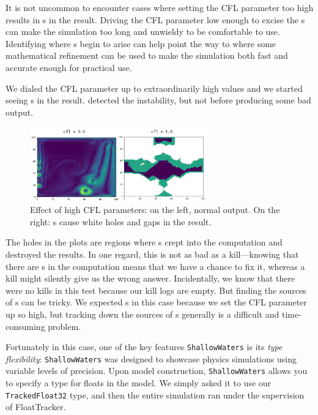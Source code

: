 \documentclass{juliacon}
\begin{document}
It is not uncommon to encounter cases where setting the CFL parameter too high results in \NaN{}s in the result.
Driving the CFL parameter low enough to excise the \NaN{}s can make the simulation too long and unwieldy to be comfortable to use.
Identifying where \NaN{}s begin to arise can help point the way to where some mathematical refinement can be used to make the simulation both fast and accurate enough for practical use.

We dialed the CFL parameter up to extraordinarily high values and we started seeing \NaN{}s in the result.
 detected the instability, but not before producing some bad output.

\begin{figure}
  \centering
  \includegraphics[width=3in]{./fig/shallow_waters_cfl_diff.png}
  \caption{Effect of high CFL parameters: on the left, normal output. On the right: \NaN{}s cause white holes and gaps in the result.}
  \label{fig:sw_nans}
\end{figure}

The holes in the plots are regions where \NaN{}s crept into the computation and destroyed the results.
In one regard, this is not as bad as a \NaN{} kill---knowing that there are \NaN{}s in the computation means that we have a chance to fix it, whereas a \NaN{} kill might silently give us the wrong answer.
Incidentally, we know that there were no \NaN{} kills in this test because our kill logs are empty.
But finding the sources of \NaN{}s can be tricky.
We expected \NaN{}s in this case because we set the CFL parameter up so high, but tracking down the sources of \NaN{}s generally is a difficult and time-consuming problem.

Fortunately in this case, one of the key features \texttt{ShallowWaters} is its \emph{type flexibility}:
\texttt{ShallowWaters} was designed to showcase physics simulations using variable levels of \fp{} precision.
Upon model construction, \texttt{ShallowWaters} allows you to specify a type for floats in the model.
We simply asked it to use our \texttt{TrackedFloat32} type, and then the entire simulation ran under the supervision of FloatTracker.
\end{document}
